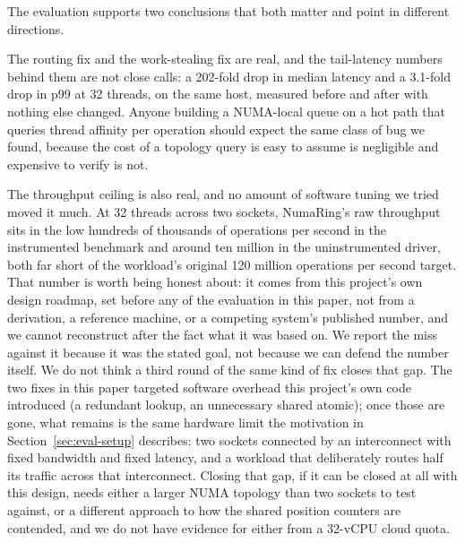 \documentclass[10pt,journal,compsoc]{IEEEtran}
\begin{document}
The evaluation supports two conclusions that both matter and point in different directions.

The routing fix and the work-stealing fix are real, and the tail-latency numbers behind them are
not close calls: a 202-fold drop in median latency and a 3.1-fold drop in p99 at 32 threads, on the
same host, measured before and after with nothing else changed. Anyone building a NUMA-local queue
on a hot path that queries thread affinity per operation should expect the same class of bug we
found, because the cost of a topology query is easy to assume is negligible and expensive to
verify is not.

The throughput ceiling is also real, and no amount of software tuning we tried moved it much. At 32
threads across two sockets, NumaRing's raw throughput sits in the low hundreds of thousands of
operations per second in the instrumented benchmark and around ten million in the uninstrumented
driver, both far short of the workload's original 120 million operations per second target. That
number is worth being honest about: it comes from this project's own design roadmap, set before
any of the evaluation in this paper, not from a derivation, a reference machine, or a competing
system's published number, and we cannot reconstruct after the fact what it was based on. We report
the miss against it because it was the stated goal, not because we can defend the number itself. We
do not think a third round of the same kind of fix closes that gap. The two fixes in this paper
targeted software overhead this project's own code introduced (a redundant lookup, an unnecessary
shared atomic); once those are gone, what remains is the same hardware limit the motivation in
Section~\ref{sec:eval-setup} describes: two sockets connected by an interconnect with fixed
bandwidth and fixed latency, and a workload that deliberately routes half its traffic across that
interconnect. Closing that gap, if it can be closed at all with this design, needs either a larger
NUMA topology than two sockets to test against, or a different approach to how the shared position
counters are contended, and we do not have evidence for either from a 32-vCPU cloud quota.
\end{document}
